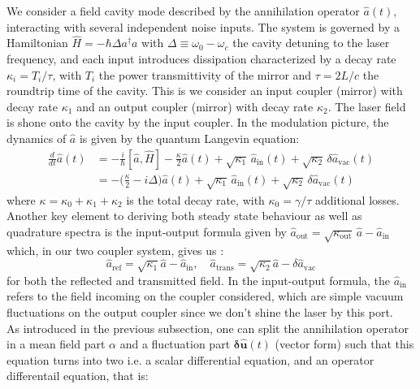 We consider a field cavity mode described by the annihilation operator \(\hat{a}(t)\), interacting with several independent noise inputs. The system is governed by a Hamiltonian \(\hat{H} = - \hbar \Delta  a^\dagger a \) with  $\Delta\equiv\omega_0 - \omega_c$ the cavity detuning to the laser frequency, and each input introduces dissipation characterized by a decay rate \(\kappa_i = T_i/\tau\), with $T_i$ the power transmittivity of the mirror and $\tau=2L/c$ the roundtrip time of the cavity. This is we consider an input coupler (mirror) with decay rate $\kappa_1$ and an output coupler (mirror) with decay rate $\kappa_2$. The laser field is shone onto the cavity by the input coupler. In the modulation picture, the dynamics of \(\hat{a}\) is given by the quantum Langevin equation:
%
\begin{equation}
\begin{split}
  \frac{d}{dt} \hat{a}(t) & = -\frac{i}{\hbar} [\hat{a}, \hat{H}] - \frac{\kappa}{2} \hat{a}(t) + \sqrt{\kappa_1} \, \hat{a}_{\mathrm{in}}(t)  + \sqrt{\kappa_2} \, \delta \hat{a}_{\mathrm{vac}}(t) \\
  & = -\Big(\frac{\kappa}{2}-i\Delta\Big) \hat{a}(t) + \sqrt{\kappa_{\mathrm{1}}} \, \hat{a}_{\mathrm{in}}(t)  + \sqrt{\kappa_2} \, \delta \hat{a}_{\mathrm{vac}}(t) 
\label{eq:qle}
\end{split}
\end{equation}
where  \(\kappa = \kappa_0 + \kappa_1 + \kappa_2\) is the total decay rate, with $\kappa_0=\gamma/\tau$ additional losses. Another key element to deriving both steady state behaviour as well as quadrature spectra is the input-output formula given by $\hat{a}_{\mathrm{out}} = \sqrt{\kappa_{\mathrm{out}}} \, \hat{a} - \hat{a}_{\mathrm{in}} $ which, in our two coupler system, gives us :
\begin{equation}
  \hat{a}_{\mathrm{ref}} = \sqrt{\kappa_{1}}\hat{a} - \hat{a}_{\mathrm{in}} , \quad \hat{a}_{\mathrm{trans}} = \sqrt{\kappa_{2}}\hat{a} - \delta \hat{a}_{\mathrm{vac}} 
\end{equation}
for both the reflected and transmitted field. In the input-output formula, the $\hat{a}_{\mathrm{in}}$ refers to the field incoming on the coupler considered, which are simple vacuum fluctuations on the output coupler since we don't shine the laser by this port.\\
As introduced in the previous subsection, one can split the annihilation operator in a mean field part $\alpha$ and a fluctuation part $\mathbf{\delta \hat{u}}(t)$ (vector form) such that this equation turns into two i.e. a scalar differential equation, and an operator differentail equation, that is:
